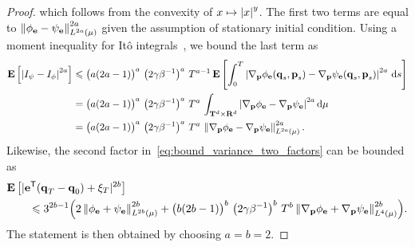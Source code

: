 \documentclass[11pt,a4paper]{article}
\begin{document}
\begin{proof}
    which follows from the convexity of $x \mapsto \abs{x}^y$.
    The first two terms are equal to $\norm{\phi_{\vect e} - \psi_{\vect e}}_{L^{2 a}(\mu)}^{2 a}$
    given the assumption of stationary initial condition.
    Using a moment inequality for It\^o integrals~\cite[Theorem 7.1]{MR2380366},
    we bound the last term as
    \begin{align*}
        \expect \left[ \abs{I_{\psi} - I_{\phi}}^{2 a} \right]
        &\leq \bigl( a(2 a - 1)\bigr)^a \, \left(2 \gamma \beta^{-1}\right)^a \,  T^{a-1} \,
        \expect \left[ \int_{0}^{T} \abs{\grad_{\vect p} \phi_{\vect e}(\vect q_s, \vect p_s) - \grad_{\vect p} \psi_{\vect e}(\vect q_s, \vect p_s)}^{2a} \, \d s\right] \\
        &= \bigl(a(2a - 1)\bigr)^a \, \left(2 \gamma \beta^{-1}\right)^a \,  T^{a} \, \int_{\torus^d \times \real^d} \abs{\grad_{\vect p} \phi_{\vect e} - \grad_{\vect p} \psi_{\vect e}}^{2a} \d \mu \\
        &= \bigl(a(2a - 1)\bigr)^a \, \left(2 \gamma \beta^{-1}\right)^a \,  T^{a} \, \norm{\grad_{\vect p} \phi_{\vect e} - \grad_{\vect p} \psi_{\vect e}}_{L^{2a}(\mu)}^{2a}.
    \end{align*}
    Likewise, the second factor in~\eqref{eq:bound_variance_two_factors} can be bounded as
    \begin{align*}
        &\expect \left[ |\vect e^\t(\vect q_T - \vect q_0) + \xi_T|^{2b} \right] \\
        &\qquad
        \leq 3^{2b-1} \Bigl( 2 \norm{\phi_{\vect e} + \psi_{\vect e}}[L^{2b}(\mu)]^{2b}
        + \bigl(b(2b - 1)\bigr)^b \, \left(2 \gamma \beta^{-1}\right)^b \, T^{b} \norm{\grad_{\vect p} \phi_{\vect e} + \grad_{\vect p} \psi_{\vect e}}[L^{4}(\mu)]^{2b} \Bigr).
    \end{align*}
    The statement is then obtained by choosing $a = b = 2$.
\end{proof}
\end{document}
